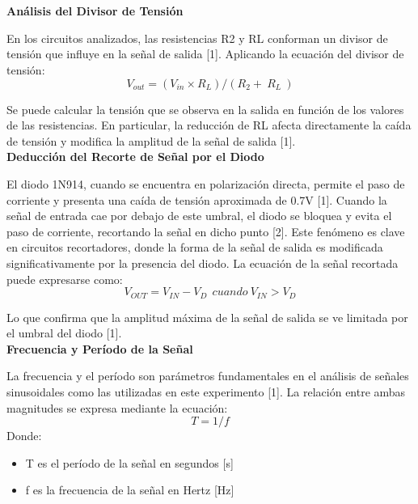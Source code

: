 \documentclass[journal]{IEEEtran}
\begin{document}
\section{}
\noindent\textbf{Análisis del Divisor de Tensión}
\par En los circuitos analizados, las resistencias R2 y RL conforman un divisor de tensión que influye en la señal de salida [1]. Aplicando la ecuación del divisor de tensión:
\begin{equation}
    V_{out}=(V_{in}\times R_L)/(R_2+\ R_L\ )
\end{equation}
\par Se puede calcular la tensión que se observa en la salida en función de los valores de las resistencias. En particular, la reducción de RL afecta directamente la caída de tensión y modifica la amplitud de la señal de salida [1].
\\
\newline
\textbf{Deducción del Recorte de Señal por el Diodo}
\par El diodo 1N914, cuando se encuentra en polarización directa, permite el paso de corriente y presenta una caída de tensión aproximada de 0.7V [1]. Cuando la señal de entrada cae por debajo de este umbral, el diodo se bloquea y evita el paso de corriente, recortando la señal en dicho punto [2]. Este fenómeno es clave en circuitos recortadores, donde la forma de la señal de salida es modificada significativamente por la presencia del diodo. La ecuación de la señal recortada puede expresarse como:
\begin{equation}
    V_{OUT}=V_{IN}-V_{D}\ \ cuando\ V_{IN}>V_{D}
\end{equation}
\par Lo que confirma que la amplitud máxima de la señal de salida se ve limitada por el umbral del diodo [1].
\\
\newline
\textbf{Frecuencia y Período de la Señal}
\par La frecuencia y el período son parámetros fundamentales en el análisis de señales sinusoidales como las utilizadas en este experimento [1]. La relación entre ambas magnitudes se expresa mediante la ecuación:
\begin{equation}
    T=1/f
\end{equation}
Donde:
\begin{itemize}
    \item T es el período de la señal en segundos [s]
	\item  f es la frecuencia de la señal en Hertz [Hz]
\end{itemize}
\end{document}
